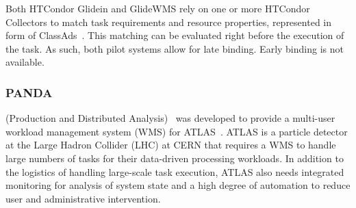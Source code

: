 \documentclass{sig-alternate}
\begin{document}

Both HTCondor Glidein and GlideWMS rely on one or more HTCondor Collectors to
match task requirements and resource properties, represented in form of
ClassAds~\cite{classad_url}. This matching can be evaluated right before the
execution of the task. As such, both pilot systems allow for late binding. Early
binding is not available.


%
\subsubsection{PANDA}
\label{sec:panda}



\panda (Production and Distributed Analysis)~\cite{zhao2011panda} was
developed to provide a multi-user workload management system (WMS) for
ATLAS~\cite{aad2008atlas}. ATLAS is a particle detector at the Large Hadron
Collider (LHC) at CERN that requires a WMS to handle large numbers of tasks for
their data-driven processing workloads. In addition to the logistics of handling
large-scale task execution, ATLAS also needs integrated monitoring for analysis
of system state and a high degree of automation to reduce user and
administrative intervention.
\end{document}

